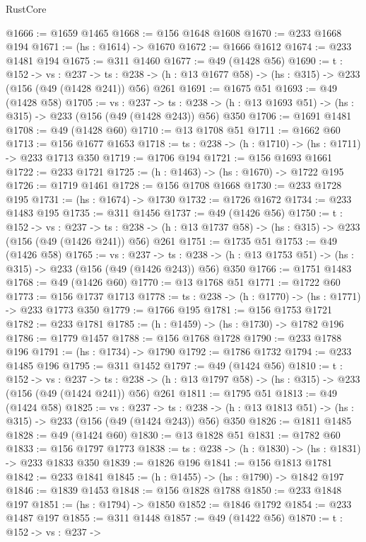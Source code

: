 \begin{lexlean}{RustCore}
\begin{coremodule}
@1666 := @1659 @1465
@1668 := @156 @1648 @1608
@1670 := @233 @1668 @194
@1671 := (hs : @1614) -> @1670
@1672 := @1666 @1612
@1674 := @233 @1481 @194
@1675 := @311 @1460
@1677 := @49 (@1428 @56)
@1690 := {t : @152} ->
  {vs : @237} ->
  {ts : @238} -> (h : @13 @1677 @58) -> (hs : @315) -> @233 (@156 (@49 (@1428 @241)) @56) @261
@1691 := @1675 @51
@1693 := @49 (@1428 @58)
@1705 := {vs : @237} ->
  {ts : @238} -> (h : @13 @1693 @51) -> (hs : @315) -> @233 (@156 (@49 (@1428 @243)) @56) @350
@1706 := @1691 @1481
@1708 := @49 (@1428 @60)
@1710 := @13 @1708 @51
@1711 := @1662 @60
@1713 := @156 @1677 @1653
@1718 := {ts : @238} -> (h : @1710) -> (hs : @1711) -> @233 @1713 @350
@1719 := @1706 @194
@1721 := @156 @1693 @1661
@1722 := @233 @1721
@1725 := (h : @1463) -> (hs : @1670) -> @1722 @195
@1726 := @1719 @1461
@1728 := @156 @1708 @1668
@1730 := @233 @1728 @195
@1731 := (hs : @1674) -> @1730
@1732 := @1726 @1672
@1734 := @233 @1483 @195
@1735 := @311 @1456
@1737 := @49 (@1426 @56)
@1750 := {t : @152} ->
  {vs : @237} ->
  {ts : @238} -> (h : @13 @1737 @58) -> (hs : @315) -> @233 (@156 (@49 (@1426 @241)) @56) @261
@1751 := @1735 @51
@1753 := @49 (@1426 @58)
@1765 := {vs : @237} ->
  {ts : @238} -> (h : @13 @1753 @51) -> (hs : @315) -> @233 (@156 (@49 (@1426 @243)) @56) @350
@1766 := @1751 @1483
@1768 := @49 (@1426 @60)
@1770 := @13 @1768 @51
@1771 := @1722 @60
@1773 := @156 @1737 @1713
@1778 := {ts : @238} -> (h : @1770) -> (hs : @1771) -> @233 @1773 @350
@1779 := @1766 @195
@1781 := @156 @1753 @1721
@1782 := @233 @1781
@1785 := (h : @1459) -> (hs : @1730) -> @1782 @196
@1786 := @1779 @1457
@1788 := @156 @1768 @1728
@1790 := @233 @1788 @196
@1791 := (hs : @1734) -> @1790
@1792 := @1786 @1732
@1794 := @233 @1485 @196
@1795 := @311 @1452
@1797 := @49 (@1424 @56)
@1810 := {t : @152} ->
  {vs : @237} ->
  {ts : @238} -> (h : @13 @1797 @58) -> (hs : @315) -> @233 (@156 (@49 (@1424 @241)) @56) @261
@1811 := @1795 @51
@1813 := @49 (@1424 @58)
@1825 := {vs : @237} ->
  {ts : @238} -> (h : @13 @1813 @51) -> (hs : @315) -> @233 (@156 (@49 (@1424 @243)) @56) @350
@1826 := @1811 @1485
@1828 := @49 (@1424 @60)
@1830 := @13 @1828 @51
@1831 := @1782 @60
@1833 := @156 @1797 @1773
@1838 := {ts : @238} -> (h : @1830) -> (hs : @1831) -> @233 @1833 @350
@1839 := @1826 @196
@1841 := @156 @1813 @1781
@1842 := @233 @1841
@1845 := (h : @1455) -> (hs : @1790) -> @1842 @197
@1846 := @1839 @1453
@1848 := @156 @1828 @1788
@1850 := @233 @1848 @197
@1851 := (hs : @1794) -> @1850
@1852 := @1846 @1792
@1854 := @233 @1487 @197
@1855 := @311 @1448
@1857 := @49 (@1422 @56)
@1870 := {t : @152} ->
  {vs : @237} ->

\end{coremodule}
\end{lexlean}
